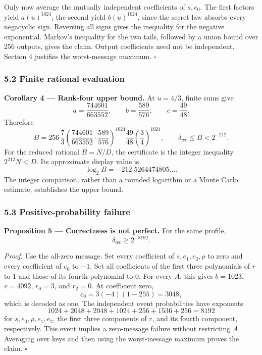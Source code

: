 \documentclass[
  10pt,
  a4paper,
]{article}
\begin{document}
Only now average the mutually independent coefficients of \(s,e_0\). The
first factors yield \(a(u)^{1024}\); the second yield \(b(u)^{1024}\),
since the secret law absorbs every negacyclic sign. Reversing all signs
gives the inequality for the negative exponential. Markov's inequality
for the two tails, followed by a union bound over 256 outputs, gives the
claim. Output coefficients need not be independent. Section 4 justifies
the worst-message maximum. \(\square\)

\subsubsection{5.2 Finite rational
evaluation}\label{finite-rational-evaluation}

\textbf{Corollary 4 --- Rank-four upper bound.} At \(u=4/3\), finite
sums give \[
a=\frac{744601}{663552},\qquad b=\frac{589}{576},\qquad c=\frac{49}{48}.
\] Therefore \[
B=256\,\frac73\left(\frac{744601}{663552}\cdot\frac{589}{576}\right)^{1024}
\frac{49}{48}\left(\frac34\right)^{1024},\qquad
\delta_{wc}\le B<2^{-212}.
\] For the reduced rational \(B=N/D\), the certificate is the integer
inequality \(2^{212}N<D\). Its approximate display value is \[
\log_2 B=-212.5264474805\ldots.
\] The integer comparison, rather than a rounded logarithm or a Monte
Carlo estimate, establishes the upper bound.

\subsubsection{5.3 Positive-probability
failure}\label{positive-probability-failure}

\textbf{Proposition 5 --- Correctness is not perfect.} For the same
profile, \[
\delta_{wc}\ge2^{-8192}.
\]

\emph{Proof.} Use the all-zero message. Set every coefficient of
\(s,e_1,e_2,\rho\) to zero and every coefficient of \(e_0\) to \(-1\).
Set all coefficients of the first three polynomials of \(r\) to 1 and
those of its fourth polynomial to 0. For every \(A\), this gives
\(b=1023\), \(v=4092\), \(r_0=3\), and \(r_2=0\). At coefficient zero,
\[
\varepsilon_0=3(-4)(1-255)=3048,
\] which is decoded as one. The independent event probabilities have
exponents \[
1024+2048+2048+1024+256+1536+256=8192
\] for \(s,e_0,\rho,e_1,e_2\), the first three components of \(r\), and
its fourth component, respectively. This event implies a zero-message
failure without restricting \(A\). Averaging over keys and then using
the worst-message maximum proves the claim. \(\square\)
\end{document}
